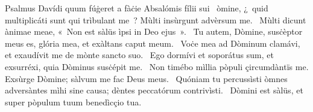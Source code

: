 { Psalmus Davídi quum fúġeret a fàċie Absalómis fílii sui}
{%
~òmine, ¿~quid multiplicáti sunt qui trìbulant me~? Mùlti insùrgunt advèrsum me.
~Mùlti dicunt ànimae meae, «~Non est sàlüs ìpsi in Deo ejus~».
~Tu autem, Dòmine, susċèptor meus es, glória mea, et exàltans caput meum.
~Voċe mea ad Dòminum clamávi, et exaudívit me de mònte sancto suo.
~Ego dormívi et soporátus sum, et exsurréxi, quia Dòminus susċépit me.
~Non timébo mìllia pòpuli çircumdàntïs me. Exsùrge Dòmine; sàlvum me fac Deus meus.
~Quóniam tu percussìsti òmnes adversàntes mìhi sine causa; dèntes peccatórum contrivìsti.
~Dòmini est sàlüs, et super pòpulum tuum benedìcçio tua.
}
